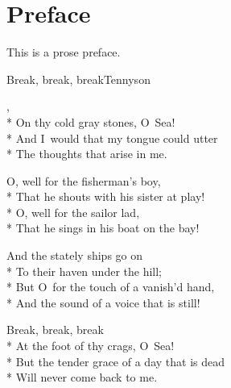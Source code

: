 \documentclass[12pt]{book}
\begin{document}
\maketitle
\makededication

\frontmatter

\maketoc

\renewcommand*{\topname}{Poems} %
\maketop

\section{Preface}
This is a prose preface.

\newpage
\thispagestyle{empty}

\mainmatter

\begin{poem}{Break, break, break}{Tennyson}

\settowidth{\versewidth}{But the tender grace of a day that is dead}

\begin{altverse}
,\\*
On thy cold gray stones, O~Sea!\\*
And I~would that my tongue could utter\\*
The thoughts that arise in me.
\end{altverse}

\begin{altverse}
O, well for the fisherman's boy,\\*
That he shouts with his sister at play!\\*
O, well for the sailor lad,\\*
That he sings in his boat on the bay!
\end{altverse}

\begin{altverse}
And the stately ships go on\\*
To their haven under the hill;\\*
But O~for the touch of a vanish'd hand,\\*
And the sound of a voice that is still!
\end{altverse}

\begin{altverse}
Break, break, break\\*
At the foot of thy crags, O~Sea!\\*
But the tender grace of a day that is dead\\*
Will never come back to me.
\end{altverse}

\end{poem}
\end{document}
